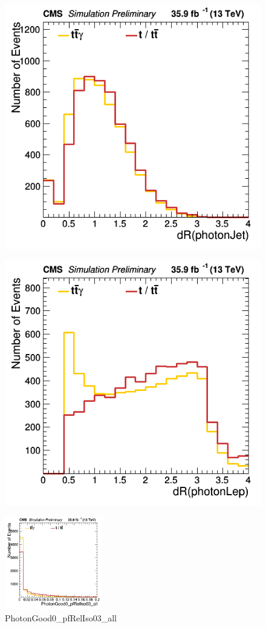 \documentclass[11pt]{scrartcl}
\begin{document}
	\begin{figure}[H]
	\centering
	\begin{minipage}{.5\textwidth}
	  \centering
	  \includegraphics[width=0.75\linewidth]{figures/Select3/photonJetdR.png}
	  \label{fig:photonJetdR}
	\end{minipage}%
	\begin{minipage}{.5\textwidth}
	  \centering
	  \includegraphics[width=0.75\linewidth]{figures/Select3/photonLepdR.png}
	  \label{fig:photonLepdR}
	\end{minipage}
	\end{figure}

	\begin{figure}[H]
	\centering
	\includegraphics[width=0.38\textwidth]{figures/Select3/PhotonGood0_pfRelIso03_all.png}
	\caption{PhotonGood0\_pfRelIso03\_all}
 	\label{fig:PhotonGood0pfRelIso03all}
	\end{figure}
\end{document}
